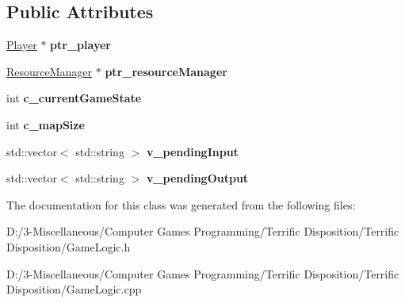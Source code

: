 \subsection*{Public Attributes}
\begin{DoxyCompactItemize}
\item 
\mbox{\label{class_game_logic_a3fe0f96ce32c1fe406d1ccceeef4c6e1}} 
\hyperlink{class_player}{Player} $\ast$ {\bfseries ptr\+\_\+player}
\item 
\mbox{\label{class_game_logic_af85b05b7e4dda5dec92367e40e515923}} 
\hyperlink{class_resource_manager}{Resource\+Manager} $\ast$ {\bfseries ptr\+\_\+resource\+Manager}
\item 
\mbox{\label{class_game_logic_a3f1c6422c681214869826d394e7e1ad6}} 
int {\bfseries c\+\_\+current\+Game\+State}
\item 
\mbox{\label{class_game_logic_ae1c7e0d5a574aaca7d089011460c221d}} 
int {\bfseries c\+\_\+map\+Size}
\item 
\mbox{\label{class_game_logic_a7c6415a56b7e7440c8038fdf0a0ab17c}} 
std\+::vector$<$ std\+::string $>$ {\bfseries v\+\_\+pending\+Input}
\item 
\mbox{\label{class_game_logic_a66a4e96bd4121f721733696f7d78a910}} 
std\+::vector$<$ std\+::string $>$ {\bfseries v\+\_\+pending\+Output}
\end{DoxyCompactItemize}


The documentation for this class was generated from the following files\+:\begin{DoxyCompactItemize}
\item 
D\+:/3-\/\+Miscellaneous/\+Computer Games Programming/\+Terrific Disposition/\+Terrific Disposition/Game\+Logic.\+h\item 
D\+:/3-\/\+Miscellaneous/\+Computer Games Programming/\+Terrific Disposition/\+Terrific Disposition/Game\+Logic.\+cpp\end{DoxyCompactItemize}
